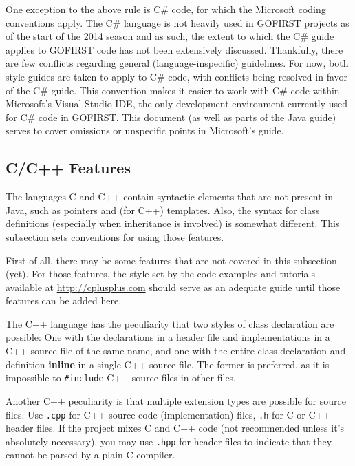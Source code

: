 \documentclass[12pt]{article}
\newcommand{\code}[1]{\texttt{#1}}
\newcommand{\textdef}[1]{\textbf{#1}}
\begin{document}
One exception to the above rule is C\# code, for which the Microsoft coding conventions \cite{csguide} apply. The C\# language is not heavily used in GOFIRST projects as of the start of the 2014 season and as such, the extent to which the C\# guide applies to GOFIRST code has not been extensively discussed. Thankfully, there are few conflicts regarding general (language-inspecific) guidelines. For now, both style guides are taken to apply to C\# code, with conflicts being resolved in favor of the C\# guide. This convention makes it easier to work with C\# code within Microsoft's Visual Studio IDE, the only development environment currently used for C\# code in GOFIRST. This document (as well as parts of the Java guide) serves to cover omissions or unspecific points in Microsoft's guide.

\subsection{C/C++ Features}
\label{sec:ccpp-special}
The languages C and C++ contain syntactic elements that are not present in Java, such as pointers and (for C++) templates. Also, the syntax for class definitions (especially when inheritance is involved) is somewhat different. This subsection sets conventions for using those features.

First of all, there may be some features that are not covered in this subsection (yet). For those features, the style set by the code examples and tutorials available at \url{http://cplusplus.com} should serve as an adequate guide until those features can be added here.

The C++ language has the peculiarity that two styles of class declaration are possible: One with the declarations in a header file and implementations in a C++ source file of the same name, and one with the entire class declaration and definition \textdef{inline} in a single C++ source file. The former is preferred, as it is impossible to \code{\#include} C++ source files in other files.

Another C++ peculiarity is that multiple extension types are possible for source files. Use \code{.cpp} for C++ source code (implementation) files, \code{.h} for C or C++ header files. If the project mixes C and C++ code (not recommended unless it's absolutely necessary), you may use \code{.hpp} for header files to indicate that they cannot be parsed by a plain C compiler.
\end{document}
